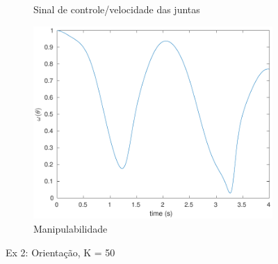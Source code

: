 \documentclass[a4paper,11pt]{article}
\theoremstyle{mytheor}
\begin{document}
\begin{figure}[!ht]
\begin{minipage}{\linewidth}
\begin{subfigure}[b]{0.49\textwidth}
    \caption{Sinal de controle/velocidade das juntas}
    \label{fig:ex2_1_dq}
    \end{subfigure}
    \begin{subfigure}[b]{0.49\textwidth}
    \includegraphics[width=1\textwidth]{figs/ex2_1_manip.pdf}
    \caption{Manipulabilidade}
    \label{fig:ex2_1_manip}
    \end{subfigure}
  \end{minipage}
\caption{Ex 2: Orientação, K = 50}
\label{fig:ex2_1}
\end{figure}
\end{document}
